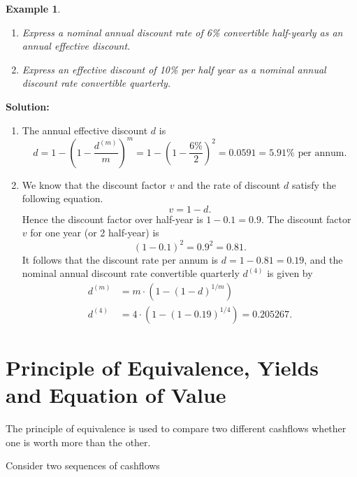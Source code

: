 \documentclass[
]{book}
\theoremstyle{definition}
\theoremstyle{definition}
\newtheorem{example}{Example}[chapter]
\theoremstyle{definition}
\theoremstyle{definition}
\theoremstyle{remark}
\begin{document}
\begin{example}
\protect\hypertarget{exm:unlabeled-div-43}{}\label{exm:unlabeled-div-43}

\begin{enumerate}
\def\labelenumi{\arabic{enumi}.}
\item
  \emph{Express a nominal annual discount rate of 6\% convertible
  half-yearly as an annual effective discount.}
\item
  \emph{Express an effective discount of 10\% per half year as a nominal
  annual discount rate convertible quarterly.}
\end{enumerate}

\end{example}

\textbf{Solution:}

\begin{enumerate}
\def\labelenumi{\arabic{enumi}.}
\item
  The annual effective discount \(d\) is
  \[d = 1-  \left(1 - \frac{d^{(m)}}{m}\right)^m = 1-  \left(1 - \frac{6\%}{2}\right)^2 = 0.0591 = 5.91\% \text{ per annum}.\]
\item
  We know that the discount factor \(v\) and the rate of discount \(d\)
  satisfy the following equation. \[v =  1- d.\] Hence the discount
  factor over half-year is \(1 - 0.1 = 0.9\). The discount factor \(v\)
  for one year (or 2 half-year) is \[(1-0.1)^2 = 0.9^2 = 0.81.\] It
  follows that the discount rate per annum is \(d = 1- 0.81 = 0.19\),
  and the nominal annual discount rate convertible quarterly \(d^{(4)}\)
  is given by \[\begin{aligned}
       d^{(m)} &= m \cdot \left( 1-      (1 - d)^{1/m}  \right) \\
       d^{(4)} &= 4 \cdot \left( 1-      (1 - 0.19)^{1/4}  \right) = 0.205267.
      \end{aligned}\]
\end{enumerate}

\hypertarget{principle-of-equivalence-yields-and-equation-of-value}{%
\section{Principle of Equivalence, Yields and Equation of Value}\label{principle-of-equivalence-yields-and-equation-of-value}}

The principle of equivalence is used to compare two different cashflows
whether one is worth more than the other.

Consider two sequences of cashflows
\end{document}
